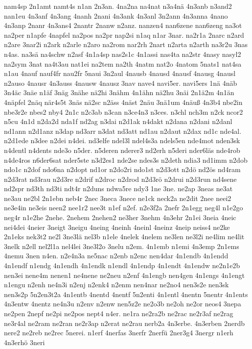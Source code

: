 {nam4sp
2n1amt
namt4s
n1an
2n3an.
4na2na
na4nat
n3a4nä
4n3anb
n3and2
nan1eu
4n3anf
4n3ang
4nanh
2nani
4n3ank
4n3anl
3n2ann
4n3anna
4nano
4n3anp
2nanr
4n3ans4
2nantr
2nanw
n2anz.
nanzen4
nan6zene
nan6zeng
na3ot
na2per
n1apfe
4napfel
na2pos
na2pr
nap2si
n1aq
n1ar
3nar.
na2r1a
2narc
n2ard
n2are
3nar2i
n2ark
n2arle
n2aro
na2rom
nar2rh
2nart
n2arta
n2arth
na3r2u
3nas
n4as.
na3sä
na4schw
n2asf
4n1a4sp
nas2s1c
4n1assi
nas4ta
na2str
4nasy
nasyl2
na2sym
3nat
na4t3au
nat1ei
na2tem
na2th
4natm
nat2o
4natom
5nats1
nat4sa
n1au
4nauf
nauf4fr
nau2fr
5naui
3n2aul
4nausb
4nausd
4nausf
4nausg
4nausl
n2auso
4nausr
4n3auss
4nausw
4nausz
3nav
nave4
navi5er.
navi5ers
1nä
4näb
3n4äc
3näe
n1äf
3näg
3nähe
nä2hi
3nähm
4n1ähn
nä2hu
3näi
2n1ä2m
4n1än
4näpfel
2näq
när4s5t
3näs
nä2sc
n2äss
4näst
2näu
3nä1um
4näuß
4n3b4
nbe2in
nbe3r2e
nbes2
nby4
2n1c
n2c3ab
n3can
n3ce4n3
n3ces.
n3chl
nch3m
n2ck
ncor2
n5cu
4n1d
n2da2d
nda1f
nd2ag
n3dai
n2d1ak
n4dakt
n2dana
n2dani
n2danl
nd1ann
n2d1anz
n3dap
nd3arr
n3dat
nd3att
nd1au
n2daut
n2dax
nd1c
nde4al.
n2d1ede
n3dee
n2dei
n4dei.
nd3elfe
ndel3l
ndel4s3a
ndels5en
nde4mot
nden3sk
n4dentl
n4dents
nde3o
n5der.
n5deren
nderer3
nd2erh
n5deri
nder6läs
nde4rob
n4de4ros
n6der6sat
nder5ste
n3d2es1
nde2se
ndes3s
n2deth
ndia3
nd1imm
n2dob
ndo1c
n2dof
ndo6na
n2dopt
nd1or
n2do2ri
ndo1st
n2d3ott
n2dö
nd2ös
nd4ram
n2d3rat
nd3rau
n2d3re
n2drif
n2droc
n2drod
n2d3rö
n2drui
n2d3run
nd4sene
nd2spr
nd3th
nd3ti
ndt4r
n2duns
ndwa5re
ndy3
1ne
3ne.
ne2ap
3neas
ne3at
ne3au
ne2bl
2n1ebn
neb4r
2nec
3neca
3nece
ne1ck
neck2a
ne2dit
2nee
neei2
ne3e4in
ne3eis
neen2
nee1r2
nee3t
n1ef
n2ef.
n2e3f2a
2nefr
2n1egg
neg4l
n1e2go
neg4r
n1e2he
2nehe.
2nehem
2nehen2
ne3her
3nehm
4n3ehr
2n1ei
3neia
4neic
nei4dei
4neier
3neigt
3neigu
4neing
4neinh
4neinl
4neinz
4neip
neiss4
ne2ke
2n1eks
nek3t2
ne2l
3ne3lä
nel3b
n1ele
4nelek
4nelem
ne3len
ne3l2i
ne4lim
ne4lit
3nelk
n2ell
nel2l1a
nel4lei
3ne3l2o
3nelu
n2em.
4n1emb
n1emi
4n3emp
2n1ems
4nemu
3nen
n4en.
n2e4n3a
ne5nac
n2enb
n2enc
nen4dar
4n1endb
4n1endd
4n1endf
n1endg
4n1endh
4n1endk
n1endl
4n1endp
4n1endt
4n1endw
ne2n1e2b
nen3ei
nene4m
nenen1
ne4nene
ne2neu
n2enf
4n1engb
nen4gen
4n1engs
4n1engt
n1engu
n2enh
ne4n3i
n2enj
n2enk4
n2enm
nen4nar
ne2no4
nen3s2e
nen3sk
nen3s2p
5n2en3t2a
4n1entb
4nentd
4nentf
5n2enti
4n1entl
4nentn
5nentr
4n1ents
4n3entw
4nentz
ne4n3u
n2env
n2enw
nen5z2e
ne2o3b
ne2oh
ne2or
neos4
3nepa
ne2pen
2nepf
ne2pi
ne2pos
nept4
n4er.
ne1ra
ne2ra2b
ne2rac
ne2r3af
ne2rag
ne3r4al
ne2ram
ne2ran
ne2r3ap
n2erat
ne2rau
nerb2a
4n3erbe.
4n3erben
2nerdb
nere2
ne2reb
ne2rec
5nerei.
n1erf
4nerfas
3nerfr
2nerfü
2ner3g4
3nergr
n1erh
4n3erhö
3neri
}
